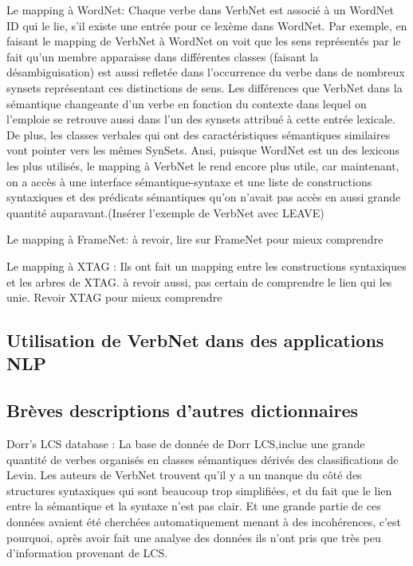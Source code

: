Le mapping à WordNet: 
Chaque verbe dans VerbNet est associé à un WordNet ID qui le lie, s'il existe une entrée pour ce lexème dans WordNet. Par exemple, en faisant le mapping de VerbNet à WordNet on voit que les sens représentés par le fait qu'un membre apparaisse dans différentes classes (faisant la désambiguisation) est aussi refletée dans l'occurrence du verbe dans de nombreux synsets représentant ces distinctions de sens. Les différences que VerbNet dans la sémantique changeante d'un verbe en fonction du contexte dans lequel on l'emploie se retrouve aussi dans l'un des synsets attribué à cette entrée lexicale. De plus, les classes verbales qui ont des caractéristiques sémantiques similaires vont pointer vers les mêmes SynSets. Ansi, puisque WordNet est un des lexicons les plus utilisés, le mapping à VerbNet le rend encore plus utile, car maintenant, on a accès à une interface sémantique-syntaxe et une liste de constructions syntaxiques et des prédicats sémantiques qu'on n'avait pas accès en aussi grande quantité auparavant.(Insérer l'exemple de VerbNet avec LEAVE)

Le mapping à FrameNet: à revoir, lire sur FrameNet pour mieux comprendre

Le mapping à XTAG : Ils ont fait un mapping entre les constructions syntaxiques et les arbres de XTAG. à revoir aussi, pas certain de comprendre le lien qui les unie. Revoir XTAG pour mieux comprendre

\subsection {Utilisation de VerbNet dans des applications NLP}



\subsection{Brèves descriptions d'autres dictionnaires}

Dorr's LCS database : La base de donnée de Dorr LCS,inclue une grande quantité de verbes organisés en classes sémantiques dérivés des classifications de Levin. Les auteurs de VerbNet trouvent qu'il y a un manque du côté des structures syntaxiques qui sont beaucoup trop simplifiées, et du fait que le lien entre la sémantique et la syntaxe n'est pas clair. Et une grande partie de ces données avaient été cherchées automatiquement menant à des incohérences, c'est pourquoi, après avoir fait une analyse des données ils n'ont pris que très peu d'information provenant de LCS.

